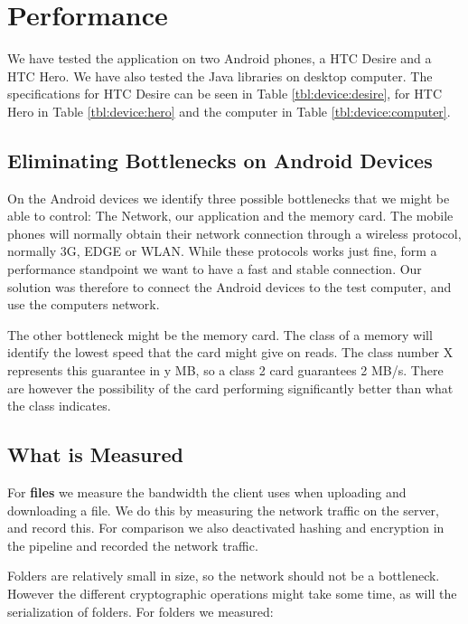 \documentclass[pdftex,english,10pt,b5paper,twoside]{book}
\begin{document}
\section{Performance}
We have tested the application on two Android phones, a HTC Desire and a HTC
Hero. We have also tested the Java libraries on desktop computer. The
specifications for HTC Desire can be seen in Table \ref{tbl:device:desire},
for HTC Hero in Table \ref{tbl:device:hero} and the computer in Table
\ref{tbl:device:computer}.





\subsection{Eliminating Bottlenecks on Android Devices}
On the Android devices we identify three possible bottlenecks that we might be
able to control: The Network, our application and the memory card. The mobile
phones will normally obtain their network connection through a wireless
protocol, normally 3G, EDGE or WLAN. While these protocols works just fine,
form a performance standpoint we want to have a fast and stable connection. Our
solution was therefore to connect the Android devices to the test computer, and
use the computers network.

The other bottleneck might be the memory card. The class of a memory will
identify the lowest speed that the card might give on reads. The class number X
represents this guarantee in y MB, so a class 2 card guarantees 2 MB/s. There
are however the possibility of the card performing significantly better than
what the class indicates.

\subsection{What is Measured}
For \textbf{files} we measure the bandwidth the client uses when uploading and
downloading a file. We do this by measuring the network traffic on the
server, and record this. For comparison we also deactivated hashing and
encryption in the pipeline and recorded the network traffic.

Folders are relatively small in size, so the network should not be a
bottleneck. However the different cryptographic operations might take some
time, as will the serialization of folders. For folders we measured:
\end{document}
